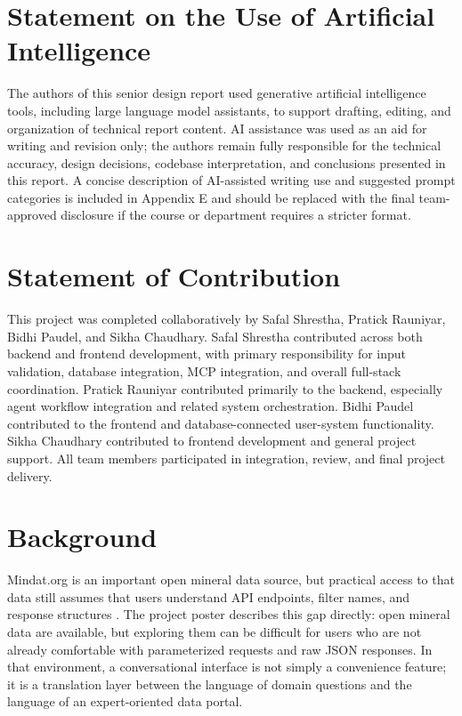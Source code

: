 \documentclass[12pt,oneside]{report}
\begin{document}
\clearpage
\section*{Statement on the Use of Artificial Intelligence}

\noindent The authors of this senior design report used generative artificial intelligence tools, including large language model assistants, to support drafting, editing, and organization of technical report content. AI assistance was used as an aid for writing and revision only; the authors remain fully responsible for the technical accuracy, design decisions, codebase interpretation, and conclusions presented in this report. A concise description of AI-assisted writing use and suggested prompt categories is included in Appendix E and should be replaced with the final team-approved disclosure if the course or department requires a stricter format.

\clearpage
\section*{Statement of Contribution}

\noindent This project was completed collaboratively by Safal Shrestha, Pratick Rauniyar, Bidhi Paudel, and Sikha Chaudhary. Safal Shrestha contributed across both backend and frontend development, with primary responsibility for input validation, database integration, MCP integration, and overall full-stack coordination. Pratick Rauniyar contributed primarily to the backend, especially agent workflow integration and related system orchestration. Bidhi Paudel contributed to the frontend and database-connected user-system functionality. Sikha Chaudhary contributed to frontend development and general project support. All team members participated in integration, review, and final project delivery.

\clearpage
{}

\section{Background}
Mindat.org is an important open mineral data source, but practical access to that data still assumes that users understand API endpoints, filter names, and response structures \citep{mindat}. The project poster describes this gap directly: open mineral data are available, but exploring them can be difficult for users who are not already comfortable with parameterized requests and raw JSON responses. In that environment, a conversational interface is not simply a convenience feature; it is a translation layer between the language of domain questions and the language of an expert-oriented data portal.
\end{document}
